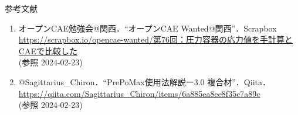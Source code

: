 \begin{frame}{参考文献}
  \begin{enumerate}[label=\textbf{［\arabic*］},itemsep=1ex, leftmargin=1mm]
      \item オープンCAE勉強会@関西．“オープンCAE Wanted@関西”．Scrapbox\\
          {\footnotesize {} \color{cud_orange}
          \url{https://scrapbox.io/opencae-wanted/第76回：圧力容器の応力値を手計算とCAEで比較した}} \\
          (参照 2024-02-23)
      \item @Sagittarius\_Chiron．“PrePoMax使用法解説ー3.0 複合材”．Qiita．\\
          {\footnotesize {} \color{cud_orange}
          \url{https://qiita.com/Sagittarius_Chiron/items/6a885ea8ee8f35c7a89c}} \\
          (参照 2024-02-23)
  \end{enumerate}
\end{frame}
